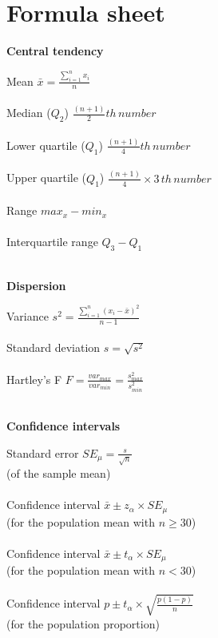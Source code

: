 \section{Formula sheet}
\label{formulasheet}

\begin{minipage}[t]{.45\textwidth}
\begin{center}
    \textbf{Central tendency}
\end{center}
\hline
\answerskip
Mean \hfill $\bar{x} = \frac{\sum^n_{i = 1} x_i}{n}$ \\
\\
Median ($Q_2$) \hfill $\frac{(n + 1)}{2}th \, number$ \\
\\
Lower quartile ($Q_1$) \hfill $\frac{(n + 1)}{4}th \, number$ \\
\\
Upper quartile ($Q_1$) \hfill $\frac{(n + 1)}{4} \times 3\, th \, number$ \\
\\
Range \hfill $max_x - min_x$ \\
\\
Interquartile range \hfill $Q_3 - Q_1$ \\
\\
\begin{center}
    \textbf{Dispersion}
\end{center}
\hline
\answerskip
Variance \hfill $s^2 = \frac{\sum^n_{i = 1} (x_i - \bar{x})^2}{n - 1}$ \\
\\
Standard deviation \hfill $s = \sqrt{s^2}$ \\
\\
Hartley's F \hfill $F = \frac{var_{max}}{var_{min}} = \frac{s^2_{max}}{s^2_{min}}$\\
\\
\begin{center}
    \textbf{Confidence intervals}
\end{center}
\hline
\answerskip
Standard error \hfill $SE_\mu = \frac{s}{\sqrt{n}}$ \\
{\scriptsize (of the sample mean)}\\
\\
Confidence interval \hfill $\bar{x} \pm z_\alpha \times SE_\mu$ \\
{\scriptsize (for the population mean with $n \geq 30$)}\\
\\
Confidence interval \hfill $\bar{x} \pm t_\alpha \times SE_\mu$ \\
{\scriptsize (for the population mean with $n < 30$)}\\
\\
Confidence interval \hfill $p \pm t_\alpha \times \sqrt{\frac{p(1 - p)}{n}}$ \\
{\scriptsize (for the population proportion)}\\
\end{minipage}
